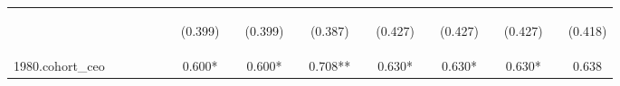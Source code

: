 \begin{center}
\begin{tabular}{lcccccccccccccccccc}
\vspace{4pt} & \begin{footnotesize}\end{footnotesize} & \begin{footnotesize}\end{footnotesize} & \begin{footnotesize}\end{footnotesize} & \begin{footnotesize}\end{footnotesize} & \begin{footnotesize}\end{footnotesize} & \begin{footnotesize}(0.399)\end{footnotesize} & \begin{footnotesize}\end{footnotesize} & \begin{footnotesize}(0.399)\end{footnotesize} & \begin{footnotesize}\end{footnotesize} & \begin{footnotesize}(0.387)\end{footnotesize} & \begin{footnotesize}\end{footnotesize} & \begin{footnotesize}(0.427)\end{footnotesize} & \begin{footnotesize}\end{footnotesize} & \begin{footnotesize}(0.427)\end{footnotesize} & \begin{footnotesize}\end{footnotesize} & \begin{footnotesize}(0.427)\end{footnotesize} & \begin{footnotesize}\end{footnotesize} & \begin{footnotesize}(0.418)\end{footnotesize} \\
1980.cohort\_ceo &  &  &  &  &  & 0.600* &  & 0.600* &  & 0.708** &  & 0.630* &  & 0.630* &  & 0.630* &  & 0.638 \\

\end{tabular}
\end{center}
